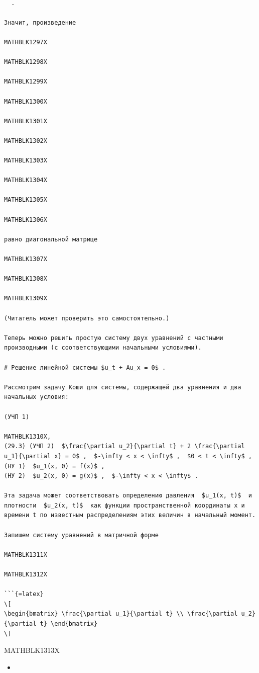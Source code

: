 \documentclass[
]{article}
\providecommand{\tightlist}{%
  \setlength{\itemsep}{0pt}\setlength{\parskip}{0pt}}
\begin{document}
\begin{verbatim}

  .

Значит, произведение

MATHBLK1297X

MATHBLK1298X

MATHBLK1299X

MATHBLK1300X

MATHBLK1301X

MATHBLK1302X

MATHBLK1303X

MATHBLK1304X

MATHBLK1305X

MATHBLK1306X

равно диагональной матрице

MATHBLK1307X

MATHBLK1308X

MATHBLK1309X

(Читатель может проверить это самостоятельно.)

Теперь можно решить простую систему двух уравнений с частными производными (с соответствующими начальными условиями).

# Решение линейной системы $u_t + Au_x = 0$ .

Рассмотрим задачу Коши для системы, содержащей два уравнения и два начальных условия:

(УЧП 1) 

MATHBLK1310X,  
(29.3) (УЧП 2)  $\frac{\partial u_2}{\partial t} + 2 \frac{\partial u_1}{\partial x} = 0$ ,  $-\infty < x < \infty$ ,  $0 < t < \infty$ ,  
(HУ 1)  $u_1(x, 0) = f(x)$ ,  
(HУ 2)  $u_2(x, 0) = g(x)$ ,  $-\infty < x < \infty$ .

Эта задача может соответствовать определению давления  $u_1(x, t)$  и плотности  $u_2(x, t)$  как функции пространственной координаты x и времени t по известным распределениям этих величин в начальный момент.

Запишем систему уравнений в матричной форме

MATHBLK1311X

MATHBLK1312X

```{=latex}
\[
\begin{bmatrix} \frac{\partial u_1}{\partial t} \\ \frac{\partial u_2}{\partial t} \end{bmatrix}
\]
\end{verbatim}

MATHBLK1313X

\begin{itemize}
\tightlist
\item
\end{itemize}
\end{document}
